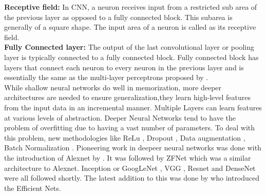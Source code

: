 \documentclass[fleqn,usenatbib]{mnras}
\begin{document}
\hspace*{0.25 in}\textbf{Receptive field:} In CNN, a neuron receives input from a restricted sub area of the previous layer as opposed to a fully connected block. This subarea is generally of a square shape. The input area of a neuron is called as its receptive field.\\
\hspace*{0.25 in}\textbf{Fully Connected layer:} The output of the last convolutional layer or pooling layer is typically connected to a fully connected block. Fully connected block has layers that connect each neuron to every neuron in the previous layer and is essentially the same as the multi-layer perceptrons proposed by \citet{mcculloch1943logical}.\\
\hspace*{0.25 in}While shallow neural networks do well in memorization, more deeper architectures are needed to ensure generalization,they learn high-level features from the input data in an incremental manner. Multiple Layers can learn features at various levels of abstraction. Deeper Neural Networks tend to have the problem of overfitting due to having a vast number of parameters. To deal with this problem, new methodologies like ReLu \citep{Nair}, Dropout \citep{srivastava}, Data augmentation \citep{Krizhevsky}, Batch Normalization \citep{Ioffe}. Pioneering work in deepeer neural networks was done with the introduction of Alexnet by \citep{alex}. It was followed by ZFNet \citep{zeiler} which was a similar architecture to Alexnet. Inception or GoogLeNet \citep{Szegedy}, VGG \citep{simonyan}, Resnet \citep{he2016} and DenseNet \citep{Huang} were all followed shortly. The latest addition to this was done by \citep{tan2019efficientnet} who introduced the Efficient Nets.
\end{document}
